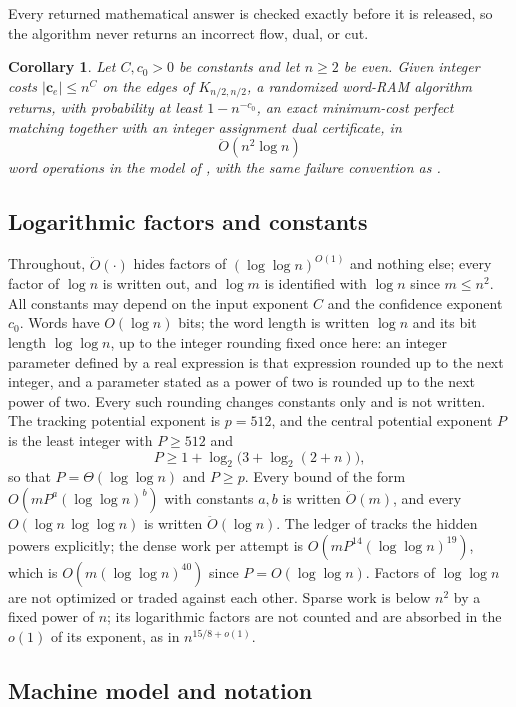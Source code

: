 \documentclass[11pt]{article}
\newtheorem{corollary}[theorem]{Corollary}
\theoremstyle{remark}
\newcommand{\cc}{\mathbf c}
\newcommand{\abs}[1]{\lvert #1\rvert}
\renewcommand{\O}{\ddot{O}}
\begin{document}
Every returned mathematical answer is checked exactly before it is released,
so the algorithm never returns an incorrect flow, dual, or cut.

\begin{corollary}
\label{cor:ram27-matching}
Let $C,c_0>0$ be constants and let $n\ge2$ be even.
Given integer costs $\abs{\cc_e}\le n^C$ on the edges of $K_{n/2,n/2}$, a
randomized word-RAM algorithm returns, with probability at least
$1-n^{-c_0}$, an exact minimum-cost perfect matching together with an integer
assignment dual certificate, in
\[
\O\left(n^2\log n\right)
\]
word operations in the model of , with the same failure
convention as .
\end{corollary}

\subsection{Logarithmic factors and constants}
\label{sec:ram27-logs}

Throughout, $\O(\cdot)$ hides factors of $(\log\log n)^{O(1)}$ and nothing
else; every factor of $\log n$ is written out, and $\log m$ is identified
with $\log n$ since $m\le n^2$.
All constants may depend on the input exponent $C$ and the confidence
exponent $c_0$.
Words have $O(\log n)$ bits; the word length is written $\log n$ and its bit
length $\log\log n$, up to the integer rounding fixed once here: an integer
parameter defined by a real expression is that expression rounded up to the
next integer, and a parameter stated as a power of two is rounded up to the
next power of two.
Every such rounding changes constants only and is not written.
The tracking potential exponent is $p=512$, and the central potential
exponent $P$ is the least integer with $P\ge512$ and
\[
P\ge1+\log_2\bigl(3+\log_2(2+n)\bigr),
\]
so that $P=\Theta(\log\log n)$ and $P\ge p$.
Every bound of the form $O(mP^a(\log\log n)^b)$ with constants $a,b$ is
written $\O(m)$, and every $O(\log n\,\log\log n)$ is written $\O(\log n)$.
The ledger of  tracks the hidden powers
explicitly; the dense work per attempt is $O(mP^{14}(\log\log n)^{19})$, which
is $O(m(\log\log n)^{40})$ since $P=O(\log\log n)$.
Factors of $\log\log n$ are not optimized or traded against each other.
Sparse work is below $n^2$ by a fixed power of $n$; its logarithmic factors
are not counted and are absorbed in the $o(1)$ of its exponent, as in
$n^{15/8+o(1)}$.

\subsection{Machine model and notation}
\label{sec:ram27-model}
\end{document}
